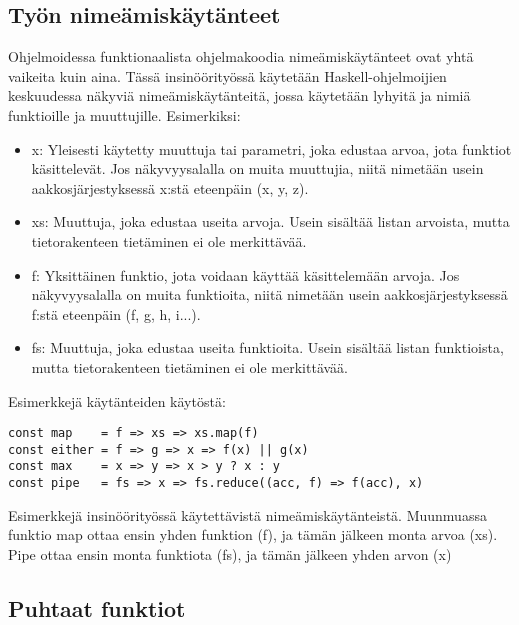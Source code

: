 \subsection{Työn nimeämiskäytänteet}

Ohjelmoidessa funktionaalista ohjelmakoodia nimeämiskäytänteet ovat yhtä vaikeita kuin aina. Tässä insinöörityössä käytetään Haskell-ohjelmoijien keskuudessa näkyviä nimeämiskäytänteitä, jossa käytetään lyhyitä ja  nimiä funktioille ja muuttujille. Esimerkiksi:

\begin{itemize}
    \item x: Yleisesti käytetty muuttuja tai parametri, joka edustaa arvoa, jota funktiot käsittelevät. Jos näkyvyysalalla on muita muuttujia, niitä nimetään usein aakkosjärjestyksessä x:stä eteenpäin (x, y, z).
    \item xs: Muuttuja, joka edustaa useita arvoja. Usein sisältää listan arvoista, mutta tietorakenteen tietäminen ei ole merkittävää.
    \item f: Yksittäinen funktio, jota voidaan käyttää käsittelemään arvoja. Jos näkyvyysalalla on muita funktioita, niitä nimetään usein aakkosjärjestyksessä f:stä eteenpäin (f, g, h, i...).
    \item fs: Muuttuja, joka edustaa useita funktioita. Usein sisältää listan funktioista, mutta tietorakenteen tietäminen ei ole merkittävää.
\end{itemize}

Esimerkkejä käytänteiden käytöstä:

\begin{code}
    \begin{verbatim}
const map    = f => xs => xs.map(f)
const either = f => g => x => f(x) || g(x)
const max    = x => y => x > y ? x : y
const pipe   = fs => x => fs.reduce((acc, f) => f(acc), x)
\end{verbatim}
    \caption{Esimerkkejä insinöörityössä käytettävistä nimeämiskäytänteistä. Muunmuassa funktio map ottaa ensin yhden funktion (f), ja tämän jälkeen monta arvoa (xs). Pipe ottaa ensin monta funktiota (fs), ja tämän jälkeen yhden arvon (x)}
    \label{code:javascript_naming_convention_example}
\end{code}

\subsection{Puhtaat funktiot}

